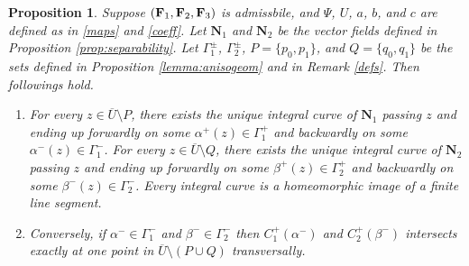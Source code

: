 \documentclass[11pt]{amsart}
\theoremstyle{plain}
\newtheorem{Prop}[Thm]{Proposition}
\theoremstyle{remark}
\numberwithin{equation}{section}
\numberwithin{Thm}{section}
\def\N{{\mathbf N}}
\def\F{{\bf F}}
\begin{document}
\begin{Prop} \label{lemma:2familychar}
Suppose $(\F_1,\F_2,\F_3)$ is admissbile, and $\Psi$, $U$, $a$, $b$, and $c$ are defined as in \eqref{maps} and \eqref{coeff}. Let $\N_1$ and $\N_2$ be the vector fields defined in Proposition \ref{prop:separability}. Let $\Gamma^\pm_1$, $\Gamma^\pm_2$, $P=\{p_0,p_1\}$, and $Q=\{q_0,q_1\}$ be the sets defined in Proposition \ref{lemma:anisogeom} and in Remark \ref{defs}. Then followings hold.
\begin{enumerate}
 \item For every $z \in {\overline{U}\setminus P}$, there exists the unique integral curve of $\N_1$ passing $z$ and ending up forwardly on some $\alpha^+(z)\in\Gamma_1^+$ and backwardly on some $\alpha^-(z)\in\Gamma_1^-$. For every $z\in {\overline{U}\setminus Q}$, there exists the unique integral curve of $\N_2$ passing $z$ and ending up forwardly on some $\beta^+(z)\in\Gamma_2^+$ and backwardly on some $\beta^-(z)\in\Gamma_2^-$. Every integral curve is a homeomorphic image of a finite line segment.
 \item Conversely, if $\alpha^-\in \Gamma^-_1$ and $\beta^-\in \Gamma^-_2$ then $C^+_1(\alpha^-)$ and $C^+_2(\beta^-)$ intersects exactly at one point in $\overline{U}\setminus (P \cup Q)$ transversally.
\end{enumerate}
\end{Prop}
\end{document}
